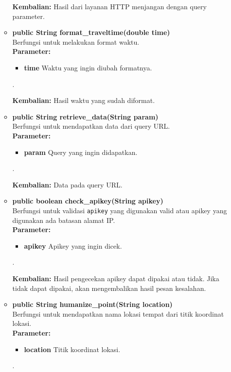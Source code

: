 \begin{enumerate}
\begin{itemize}
		\textbf{Kembalian:}  Hasil dari layanan HTTP menjangan dengan query parameter.
		
		\item \textbf{public String format\_traveltime(double time)}\\
		Berfungsi untuk melakukan format waktu.\\
		\textbf{Parameter:}
				\begin{itemize}
					\item \textbf{time} Waktu yang ingin diubah formatnya.
				\end{itemize}.
				
		\textbf{Kembalian:}  Hasil waktu yang sudah diformat.
		
		\item \textbf{public String retrieve\_data(String param)}\\
		Berfungsi untuk mendapatkan data dari query URL.\\
		\textbf{Parameter:}
				\begin{itemize}
					\item \textbf{param} Query yang ingin didapatkan.
				\end{itemize}.
				
		\textbf{Kembalian:}  Data pada query URL.
		
		\item \textbf{public boolean check\_apikey(String apikey)}\\
		Berfungsi untuk validasi \verb!apikey! yang digunakan valid atau apikey yang digunakan ada batasan alamat IP.\\
		\textbf{Parameter:}
				\begin{itemize}
					\item \textbf{apikey} Apikey yang ingin dicek.
				\end{itemize}.
				
		\textbf{Kembalian:}  Hasil pengecekan apikey dapat dipakai atau tidak. Jika tidak dapat dipakai, akan mengembalikan hasil pesan kesalahan.
		
		\item \textbf{public String humanize\_point(String location)}\\
		Berfungsi untuk mendapatkan nama lokasi tempat dari titik koordinat lokasi.\\
		\textbf{Parameter:}
				\begin{itemize}
					\item \textbf{location} Titik koordinat lokasi.
				\end{itemize}.
				

\end{itemize}
\end{enumerate}
